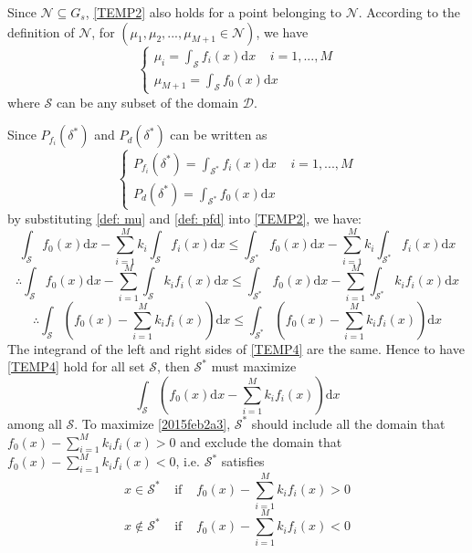 Since $\mathcal{N} \subseteq G_s$, \eqref{TEMP2} also holds for a point belonging to $\mathcal{N}$.
According to the definition of $\mathcal{N}$, for $(\mu_1, \mu_2, ..., \mu_{M+1} \in \mathcal{N})$, we have  
\begin{equation}
\label{def: mu}
\begin{cases}
\mu_i = \int_{\mathcal{S}}f_i(x)\mathrm{d}x \;\;\;\;i = 1, ..., M\\
\mu_{M+1} = \int_{\mathcal{S}}f_{0}(x)\mathrm{d}x
\end{cases}
\end{equation}
where $\mathcal{S}$ can be any subset of the domain $\mathcal{D}$. 

Since $P_{f_i}(\delta^\ast)$ and $P_{d}(\delta^\ast)$ can be written as
\begin{equation}
\label{def: pfd}
\begin{cases}
P_{f_i}(\delta^\ast) = \int_{\mathcal{S}^\ast}f_i(x)\mathrm{d}x\;\;\;\;i=1, ..., M\\
P_d(\delta^\ast) = \int_{\mathcal{S}^\ast}f_0(x)\mathrm{d}x
\end{cases}
\end{equation}
by substituting \eqref{def: mu} and \eqref{def: pfd} into \eqref{TEMP2}, we have: 
\[
\int_{\mathcal{S}}f_{0}(x)\mathrm{d}x - \sum_{i=1}^{M}k_i\int_{\mathcal{S}}f_i(x)\mathrm{d}x \leq \int_{\mathcal{S}^\ast}f_{0}(x)\mathrm{d}x - \sum_{i=1}^{M}k_i\int_{\mathcal{S}^\ast}f_i(x)\mathrm{d}x
\]
\[
\therefore 
\int_{\mathcal{S}}f_{0}(x)\mathrm{d}x - \sum_{i=1}^{M}\int_{\mathcal{S}}k_if_i(x)\mathrm{d}x \leq \int_{\mathcal{S}^\ast}f_{0}(x)\mathrm{d}x - \sum_{i=1}^{M}\int_{\mathcal{S}^\ast}k_if_i(x)\mathrm{d}x
\]
\begin{equation}
\label{TEMP4}
\therefore \int_{\mathcal{S}}(f_{0}(x)- \sum_{i=1}^{M}k_if_{i}(x))\mathrm{d}x \leq \int_{\mathcal{S}^\ast}(f_{0}(x)- \sum_{i=1}^{M}k_if_{i}(x))\mathrm{d}x 
\end{equation}
The integrand of the left  and right sides of \eqref{TEMP4} are the same. Hence to have  \eqref{TEMP4} hold for all set $\mathcal{S}$,  
then  $\mathcal{S}^\ast$ must  maximize 
\begin{equation}
\int_{\mathcal{S}}(f_{0}(x)\mathrm{d}x - \sum_{i=1}^{M}k_if_i(x))\mathrm{d}x
  \label{2015feb2a3}
\end{equation}
among all $\mathcal{S}$. To maximize \eqref{2015feb2a3}, $\mathcal{S}^\ast$ should include all the domain that $f_{0}(x)- \sum_{i=1}^{M}k_if_{i}(x) > 0$ and exclude the domain that $f_{0}(x)- \sum_{i=1}^{M}k_if_{i}(x) < 0$, i.e.   
 $\mathcal{S}^\ast$ satisfies
\[
x \in \mathcal{S}^\ast\;\;\;\;\text{if}\;\;\;\;f_{0}(x)- \sum_{i=1}^{M}k_if_{i}(x) > 0
\]
\[
x \notin \mathcal{S}^\ast\;\;\;\;\text{if}\;\;\;\;f_{0}(x)- \sum_{i=1}^{M}k_if_{i}(x) < 0
\]

